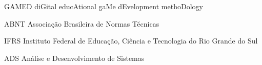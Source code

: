 \begin{siglas}
  \item[GAMED] diGital educAtional gaMe dEvelopment methoDology
  \item[ABNT] Associação Brasileira de Normas Técnicas
  \item[IFRS] Instituto Federal de Educação, Ciência e Tecnologia do Rio Grande do Sul
  \item[ADS] Análise e Desenvolvimento de Sistemas
\end{siglas}
